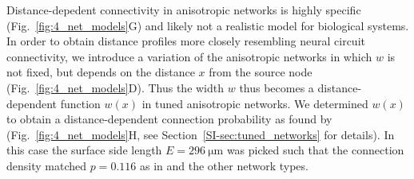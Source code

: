Distance-depedent connectivity in anisotropic networks is highly
specific (Fig.~\ref{fig:4_net_models}G) and likely not a realistic
model for biological systems. In order to obtain distance profiles
more closely resembling neural circuit connectivity, we introduce a
variation of the anisotropic networks in which $w$ is not fixed, but
depends on the distance $x$ from the source node
(Fig.~\ref{fig:4_net_models}D). Thus the width $w$ thus becomes a
distance-dependent function $w(x)$ in tuned anisotropic networks. We
determined $w(x)$ to obtain a distance-dependent connection
probability as found by \textcite{Perin2011}
(Fig.~\ref{fig:4_net_models}H, see Section~\ref{SI-sec:tuned_networks}
for details). In this case the surface side length
$E=\SI{296}{\micro\meter}$ was picked such that the connection density
matched $p=0.116$ as in \textcite{Song2005} and the other network types.







